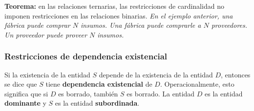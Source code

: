 \documentclass[a4paper, twoside]{article}
\begin{document}
\textbf{Teorema:} en las relaciones ternarias, las restricciones de cardinalidad no imponen restricciones en las relaciones binarias. \emph{En el ejemplo anterior, una fábrica puede comprar $N$ insumos. Una fábrica puede comprarle a $N$ proveedores. Un proveedor puede proveer $N$ insumos.}

\subsubsection{Restricciones de dependencia existencial}
Si la existencia de la entidad $S$ depende de la existencia de la entidad $D$, entonces se dice que $S$ tiene \textbf{dependencia existencial} de $D$. Operacionalmente, esto significa que si $D$ es borrado, también $S$ es borrado. La entidad $D$ es la entidad \textbf{dominante} y $S$ es la entidad \textbf{subordinada}.
\end{document}
